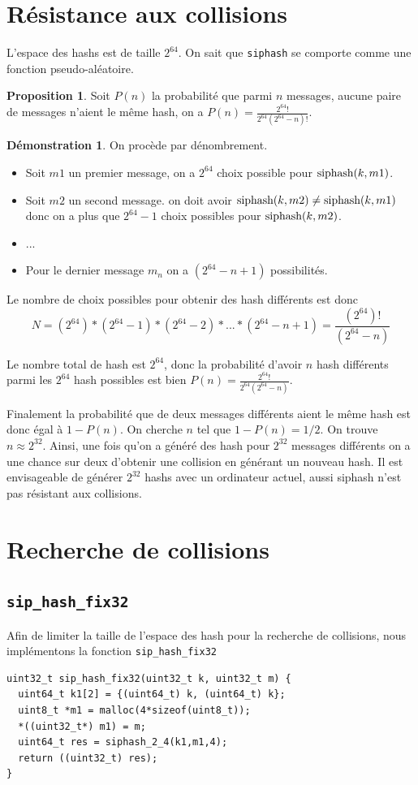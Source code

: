 \documentclass[11pt]{article}
\theoremstyle{definition}
\theoremstyle{definition}
\theoremstyle{definition}
\theoremstyle{theorem}
\newtheorem*{myprop}{Proposition}
\theoremstyle{definition}
\newtheorem*{mydemo}{Démonstration}
\begin{document}
\section{Résistance aux collisions}
L'espace des hashs est de taille $2^{64}$. On sait que \texttt{siphash} se comporte comme une fonction pseudo-aléatoire.
\begin{myprop}
Soit $P(n)$ la probabilité que parmi $n$ messages, aucune paire de messages n'aient le même
hash, on a $P(n)=\frac{2^{64}!}{2^{64}(2^{64}-n)!}$.
\end{myprop}
\begin{mydemo}
  On procède par dénombrement.
  \begin{itemize}
  \item Soit $m1$ un premier message, on a $2^{64}$ choix possible pour $\hbox{siphash}(k, m1)$.
  \item Soit $m2$ un second message. on doit avoir $\hbox{siphash}(k,m2) \neq \hbox{siphash}(k,m1)$ donc on a plus que $2^{64} - 1$ choix possibles pour $\hbox{siphash}(k, m2)$.
  \item ...
  \item Pour le dernier message $m_n$ on a $(2^{64} -n + 1)$ possibilités.
  \end{itemize}

Le nombre de choix possibles pour obtenir des hash différents est donc $$N = (2^{64}) * (2^{64} - 1) * (2^{64} - 2) * ... * (2^{64} -n + 1) = \frac{(2^{64})!}{(2^{64}-n)}$$

Le nombre total de hash est $2^{64}$, donc la probabilité d'avoir $n$ hash différents parmi les $2^{64}$ hash possibles est bien $P(n)=\frac{2^{64}!}{2^{64}(2^{64}-n)}$.
\end{mydemo}
Finalement la probabilité que de deux messages différents aient le même hash est donc égal à $1 - P(n)$.
On cherche $n$ tel que $1 - P(n)=1/2$.
On trouve $ n \approx 2^{32} $.
Ainsi, une fois qu'on a généré des hash pour $2^{32}$ messages différents on a une chance sur deux d'obtenir une collision en générant un nouveau hash.
Il est envisageable de générer $2^{32}$ hashs avec un ordinateur actuel, aussi siphash n'est pas résistant aux collisions.

\section{Recherche de collisions}
\subsection{\texttt{sip\_hash\_fix32}}
Afin de limiter la taille de l'espace des hash pour la recherche de collisions,
nous implémentons la fonction \texttt{sip\_hash\_fix32}
\begin{verbatim}
uint32_t sip_hash_fix32(uint32_t k, uint32_t m) {
  uint64_t k1[2] = {(uint64_t) k, (uint64_t) k};
  uint8_t *m1 = malloc(4*sizeof(uint8_t));
  *((uint32_t*) m1) = m;
  uint64_t res = siphash_2_4(k1,m1,4);
  return ((uint32_t) res);
}
\end{verbatim}
\end{document}
